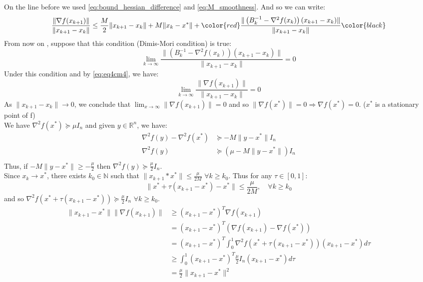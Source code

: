 \documentclass[12pt, openany]{report}
\newcommand{\R}{\mathbb{R}}
\newcommand{\N}{\mathbb{N}}
\theoremstyle{definition}
\begin{document}
On the line before we used \eqref{eq:bound_hessian_difference} and \eqref{eq:M_smoothness}. And so we can write:
\begin{equation}\label{eq:eq4cm4}
	\frac{\|\nabla f(x_{k+1})\|}{\|x_{k+1}-x_k\|} \leq \frac{M}{2} \|x_{k+1}-x_k\| + M \|x_k - x^* \| + \color{red} \frac{\|\left(B_k^{-1}-\nabla^2f(x_k)\right)(x_{k+1}-x_k)\|}{\|x_{k+1}-x_k\|}\color{black}
\end{equation}
From now on , suppose that this condition (Dimis-Mori condition) is true:
\begin{equation}\label{eq:dimis_mori_condition}
	\lim_{k\to \infty} \frac{\|\left(B_k^{-1}-\nabla^2f(x_k)\right)(x_{k+1}-x_k)\|}{\|x_{k+1}-x_k\|} = 0
\end{equation}
Under this condition and by \eqref{eq:eq4cm4}, we have:
\begin{equation}
	\lim_{k \to \infty} \frac{\|\nabla f(x_{k+1})\|}{\|x_{k+1}-x_k\|} = 0
\end{equation}
As $\|x_{k+1}-x_k\| \to 0$, we conclude that $\lim_{x \to \infty} \|\nabla f(x_{k+1})\| = 0$ and so $\|\nabla f(x^*)\| = 0 \Rightarrow \nabla f(x^*) = 0$. ($x^*$ is a stationary point of f)\\
We have $\nabla^2 f(x^*) \succeq \mu I_n$ and given $y \in \R^n$, we have:
\begin{equation}
	\begin{aligned}
		\nabla^2f(y)-\nabla^2f(x^*) &\succeq - M \|y-x^*\| I_n\\
		\nabla^2f(y) &\succeq (\mu - M \|y-x^*\|) I_n\\
	\end{aligned}
\end{equation}
Thus, if $-M \|y-x^*\| \geq - \frac{\mu}{2}$ then $\nabla^2f(y) \succeq \frac{\mu}{2} I_n$.\\
Since $x_k \to x^*$, there exists $k_0 \in \N$ such that $\|x_{k+1}*x^*\| \leq \frac{\mu}{2M}$ $\forall k \geq k_0$. Thus for any $\tau \in [0,1]$:
\begin{equation}
	\|x^*+\tau(x_{k+1}-x^*)-x^*\| \leq \frac{\mu}{2M}, \quad \forall k \geq k_0
\end{equation}
and so $\nabla^2f(x^*+\tau(x_{k+1}-x^*)) \succeq \frac{\mu}{2} I_n$ $\forall k \geq k_0$.
\begin{equation}
	\begin{aligned}
		\|x_{k+1}-x^*\|\|\nabla f(x_{k+1})\| &\geq (x_{k+1}-x^*)^T\nabla f(x_{k+1})\\
		&= (x_{k+1}-x^*)^T \left( \nabla f(x_{k+1}) - \nabla f(x^*)\right)\\
		&= (x_{k+1}-x^*)^T \int_{0}^{1} \nabla^2 f(x^*+\tau(x_{k+1}-x^*)) (x_{k+1}-x^*) d\tau\\
		&\geq \int_{0}^{1} (x_{k+1}-x^*)^T \frac{\mu}{2} I_n (x_{k+1}-x^*) d\tau\\
		&= \frac{\mu}{2} \|x_{k+1}-x^*\|^2
	\end{aligned}
\end{equation}
\end{document}

